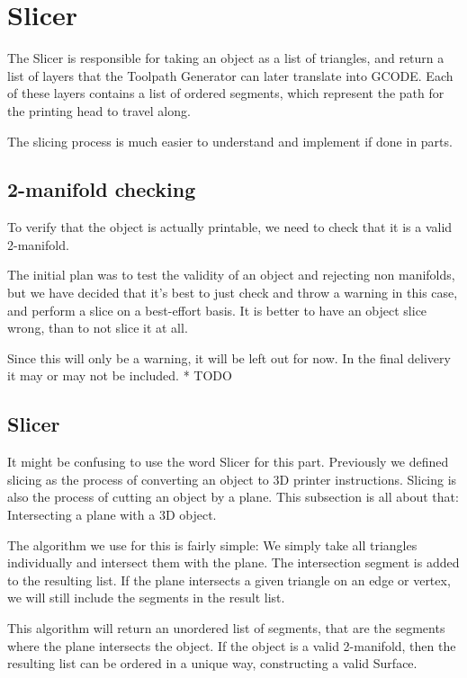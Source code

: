 \pagebreak

\section{Slicer}
The Slicer is responsible for taking an object as a list of triangles, and return a list of layers that the Toolpath Generator can later translate into GCODE. Each of these layers contains a list of ordered segments, which represent the path for the printing head to travel along.

The slicing process is much easier to understand and implement if done in parts.

\subsection{2-manifold checking}
To verify that the object is actually printable, we need to check that it is a valid 2-manifold. 

The initial plan was to test the validity of an object and rejecting non manifolds, but we have decided that it's best to just check and throw a warning in this case, and perform a slice on a best-effort basis. It is better to have an object slice wrong, than to not slice it at all.

Since this will only be a warning, it will be left out for now. In the final delivery it may or may not be included. * TODO

\subsection{Slicer}

It might be confusing to use the word Slicer for this part. Previously we defined slicing as the process of converting an object to 3D printer instructions. Slicing is also the process of cutting an object by a plane. This subsection is all about that: Intersecting a plane with a 3D object.

The algorithm we use for this is fairly simple: We simply take all triangles individually and intersect them with the plane. The intersection segment is added to the resulting list. If the plane intersects a given triangle on an edge or vertex, we will still include the segments in the result list. 

This algorithm will return an unordered list of segments, that are the segments where the plane intersects the object. If the object is a valid 2-manifold, then the resulting list can be ordered in a unique way, constructing a valid Surface.


